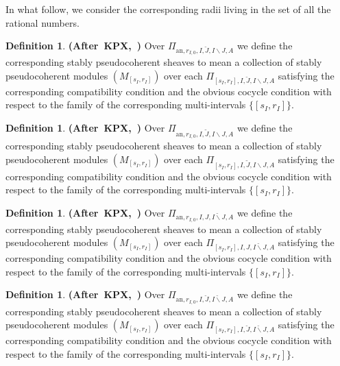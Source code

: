 \documentclass[12pt]{amsart}
\theoremstyle{definition}
\newtheorem{definition}[theorem]{Definition}
\numberwithin{equation}{section}
\begin{document}
\indent In what follow, we consider the corresponding radii living in the set of all the rational numbers.


\begin{definition} \mbox{\bf{(After KPX, \cite[Definition 2.1.3]{KPX})}}
Over $\Pi_{\mathrm{an},r_{I,0},I,\breve{J},I\backslash J,A}$ we define the corresponding stably pseudocoherent sheaves to mean a collection of stably pseudocoherent modules $(M_{[s_I,r_I]})$	over each $\Pi_{[s_I,r_I],I,\breve{J},I\backslash J,A}$ satisfying the corresponding compatibility condition and the obvious cocycle condition with respect to the family of the corresponding multi-intervals $\{[s_I,r_I]\}$.
\end{definition}


\begin{definition} \mbox{\bf{(After KPX, \cite[Definition 2.1.3]{KPX})}}
Over $\Pi_{\mathrm{an},r_{I,0},I,\widetilde{J},I\backslash J,A}$ we define the corresponding stably pseudocoherent sheaves to mean a collection of stably pseudocoherent modules $(M_{[s_I,r_I]})$	over each $\Pi_{[s_I,r_I],I,\widetilde{J},I\backslash J,A}$ satisfying the corresponding compatibility condition and the obvious cocycle condition with respect to the family of the corresponding multi-intervals $\{[s_I,r_I]\}$.
\end{definition}


\begin{definition} \mbox{\bf{(After KPX, \cite[Definition 2.1.3]{KPX})}}
Over $\Pi_{\mathrm{an},r_{I,0},I,{J},\breve{I\backslash J},A}$ we define the corresponding stably pseudocoherent sheaves to mean a collection of stably pseudocoherent modules $(M_{[s_I,r_I]})$	over each $\Pi_{[s_I,r_I],I,{J},\breve{I\backslash J},A}$ satisfying the corresponding compatibility condition and the obvious cocycle condition with respect to the family of the corresponding multi-intervals $\{[s_I,r_I]\}$.
\end{definition}


\begin{definition} \mbox{\bf{(After KPX, \cite[Definition 2.1.3]{KPX})}}
Over $\Pi_{\mathrm{an},r_{I,0},I,\breve{J},\breve{I\backslash J},A}$ we define the corresponding stably pseudocoherent sheaves to mean a collection of stably pseudocoherent modules $(M_{[s_I,r_I]})$	over each $\Pi_{[s_I,r_I],I,\breve{J},\breve{I\backslash J},A}$ satisfying the corresponding compatibility condition and the obvious cocycle condition with respect to the family of the corresponding multi-intervals $\{[s_I,r_I]\}$.
\end{definition}
\end{document}
